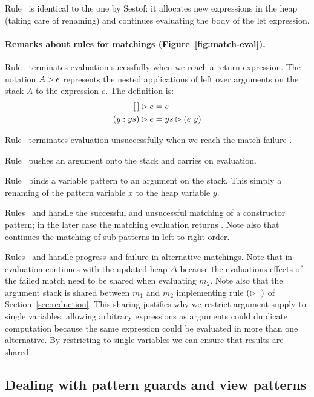   Rule~ is identical to the one by Sestof: it allocates
  new expressions in the heap (taking care of renaming) and
  continues evaluating the body of the let expression.
  
  \paragraph{Remarks about rules for matchings (Figure~\ref{fig:match-eval}).}

  Rule~ terminates evaluation sucessfully
  when we reach a return expression.
  The notation $A\rhd e$ represents the nested applications
  of  left over arguments on the stack $A$ to the expression $e$. The definition is:
  \begin{align*}
  [\,]\rhd e &= e \\
  (y:ys)\rhd e  &= ys\rhd (e~y)
  \end{align*}

  Rule~ terminates evaluation unsuccessfully when
  we reach the match failure \matchfail.

  Rule~ pushes an argument onto the stack and carries
  on evaluation.
  
  Rule~ binds a variable pattern to
  an argument on the stack. This simply a renaming of the pattern
  variable $x$ to the heap variable $y$.
  
  Rules~ and  handle the successful
  and unsucessful matching of a constructor pattern; in the later
  case the matching evaluation returns \matchfail.  Note also that
   continues the matching of sub-patterns in left to
  right order.
  

  Rules~ and  handle progress and failure
  in alternative matchings.  Note that in  evaluation
  continues with the updated heap $\Delta$ because the evaluations
  effects of the failed match need to be shared when evaluating $m_2$.
  Note also that the argument stack is shared between $m_1$ and $m_2$
  implementing rule $(\rhd\mid)$ of Section~\ref{sec:reduction}.
  This sharing justifies why we restrict argument supply to single
  variables: allowing arbitrary expressions as arguments could
  duplicate computation because the same expression could be evaluated
  in more than one alternative. By restricting to single variables
  we can ensure that results are shared.
    
    
\subsection{Dealing with pattern guards and view patterns}\label{sec:pattern-guards}

